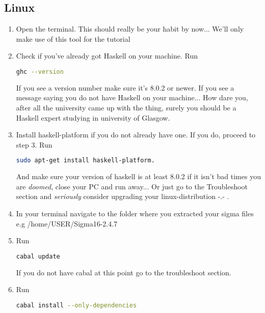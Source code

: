 \documentclass{article}
\begin{document}
 \subsection{Linux}
 \begin{enumerate}
      

   \item Open the terminal. This should really be your habit by now... We'll only make use of this tool for the tutorial
   \item Check if you've already got Haskell on your machine. Run 
\begin{lstlisting}[language=Bash]
ghc --version
\end{lstlisting}
If you see a version number make sure it's 8.0.2 or newer. If you see a message saying you do not have Haskell on your machine... How dare you, after all the university came up with the thing, surely you should be a Haskell expert studying in university of Glasgow.
   \item Install haskell-platform if you do not already have one. If you do, proceed to step 3. Run
   \begin{lstlisting}[language=Bash]
   sudo apt-get install haskell-platform.
\end{lstlisting}
And make sure your version of haskell is at least 8.0.2 if it isn't bad times you are \textit{doomed}, close your PC and run away... Or just go to the Troubleshoot section and \textit{seriously} consider upgrading your linux-distribution -.- .
   \item In your terminal navigate to the folder where you extracted your sigma files e.g /home/USER/Sigma16-2.4.7
   \item Run
      \begin{lstlisting}[language=Bash]
      cabal update
\end{lstlisting}
    If you do not have cabal at this point go to the troubleshoot section.
   \item Run
         \begin{lstlisting}[language=Bash]
         cabal install --only-dependencies
\end{lstlisting}


\end{enumerate}
\end{document}
